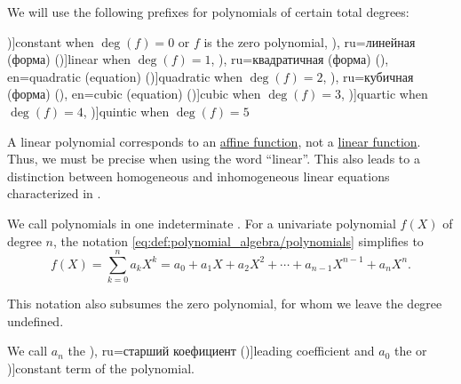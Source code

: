 \begin{definition}\label{def:polynomial_degree_terminology}
  We will use the following prefixes for polynomials of certain total degrees:
  \begin{thmenum}
     \term[ru=константа (\cite[118]{Тыртышников2007ЛинейнаяАлгебра})]{constant} when \( \deg(f) = 0 \) or \( f \) is the zero polynomial,
     \term[bg=линейна (функция) (\cite[1]{Обрешков1962ВисшаАлгебра}), ru=линейная (форма) (\cite[315]{Курош1968КурсВысшейАлгебры})]{linear} when \( \deg(f) = 1 \),
     \term[bg=квадратна (функция) (\cite[1]{Обрешков1962ВисшаАлгебра}), ru=квадратичная (форма) (\cite[315]{Курош1968КурсВысшейАлгебры}), en=quadratic (equation) (\cite[360]{RosenEtAl2018DiscreteMathematicsHandbook})]{quadratic} when \( \deg(f) = 2 \),
     \term[bg=кубична (форма) (\cite[1]{Обрешков1962ВисшаАлгебра}), ru=кубичная (форма) (\cite[315]{Курош1968КурсВысшейАлгебры}), en=cubic (equation) (\cite[360]{RosenEtAl2018DiscreteMathematicsHandbook})]{cubic} when \( \deg(f) = 3 \),
     \term[en=quartic (equation) (\cite[360]{RosenEtAl2018DiscreteMathematicsHandbook})]{quartic} when \( \deg(f) = 4 \),
     \term[en=quintic (equation) (\cite[360]{RosenEtAl2018DiscreteMathematicsHandbook})]{quintic} when \( \deg(f) = 5 \)
  \end{thmenum}
\end{definition}
\begin{comments}
  \item A linear polynomial corresponds to an \hyperref[def:affine_operator]{affine function}, not a \hyperref[def:linear_function]{linear function}. Thus, we must be precise when using the word \enquote{linear}. This also leads to a distinction between homogeneous and inhomogeneous linear equations characterized in .
\end{comments}

\begin{definition}\label{def:univariate_polynomial}\mimprovised
  We call polynomials in one indeterminate . For a univariate polynomial \( f(X) \) of degree \( n \), the notation \eqref{eq:def:polynomial_algebra/polynomials} simplifies to
  \begin{equation}\label{eq:def:univariate_polynomial}
    f(X) = \sum_{k=0}^n a_k X^k = a_0 + a_1 X + a_2 X^2 + \cdots + a_{n-1} X^{n-1} + a_n X^n.
  \end{equation}

  This notation also subsumes the zero polynomial, for whom we leave the degree undefined.

  We call \( a_n \) the \term[bg=старши коефициент (\cite[23]{ГеновМиховскиМоллов1991Алгебра}), ru=старший коефициент (\cite[118]{Тыртышников2007ЛинейнаяАлгебра})]{leading coefficient} and \( a_0 \) the  or \term[ru=свободный член (\cite[118]{Тыртышников2007ЛинейнаяАлгебра})]{constant term} of the polynomial.
\end{definition}

